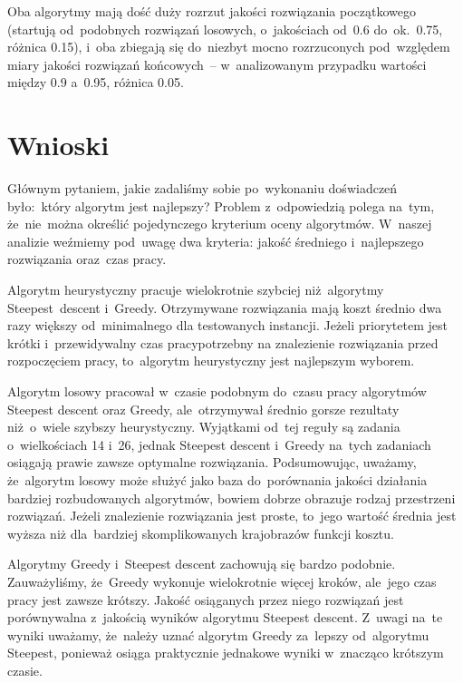 \documentclass[a4paper,10pt]{article}
\begin{document}
Oba algorytmy mają dość duży rozrzut jakości rozwiązania początkowego (startują od~podobnych rozwiązań losowych, o~jakościach
od~\num{0.6} do~ok.~\num{0.75}, różnica \num{0.15}), i~oba zbiegają się do~niezbyt mocno rozrzuconych pod~względem miary jakości rozwiązań końcowych~--
w~analizowanym przypadku wartości między \num{0.9} a~\num{0.95}, różnica \num{0.05}.

\section{Wnioski}
Głównym pytaniem, jakie zadaliśmy sobie po~wykonaniu doświadczeń było:~który algorytm jest najlepszy?
Problem z~odpowiedzią polega na~tym, że~nie~można określić pojedynczego kryterium oceny algorytmów.
W~naszej analizie weźmiemy pod~uwagę dwa kryteria: jakość średniego i~najlepszego rozwiązania oraz~czas pracy.

Algorytm heurystyczny pracuje wielokrotnie szybciej niż~algorytmy Steepest~descent i~Greedy.
Otrzymywane rozwiązania mają koszt średnio dwa razy większy od~minimalnego dla testowanych instancji.
Jeżeli priorytetem jest krótki i~przewidywalny czas pracypotrzebny na znalezienie rozwiązania przed rozpoczęciem pracy, to~algorytm heurystyczny jest najlepszym wyborem.

Algorytm losowy pracował w~czasie podobnym do~czasu pracy algorytmów Steepest descent oraz Greedy, ale~otrzymywał średnio gorsze
rezultaty niż~o~wiele szybszy heurystyczny.
Wyjątkami od~tej reguły są zadania o~wielkościach 14 i~26, jednak Steepest descent i~Greedy na~tych zadaniach osiągają prawie zawsze optymalne rozwiązania.
Podsumowując, uważamy, że~algorytm losowy może służyć jako baza do~porównania jakości działania bardziej rozbudowanych algorytmów,
bowiem dobrze obrazuje rodzaj przestrzeni rozwiązań.
Jeżeli znalezienie rozwiązania jest proste, to~jego wartość średnia jest wyższa niż dla~bardziej skomplikowanych krajobrazów funkcji
kosztu.

Algorytmy Greedy i~Steepest descent zachowują się bardzo podobnie.
Zauważyliśmy, że~Greedy wykonuje wielokrotnie więcej kroków, ale~jego czas pracy jest zawsze krótszy.
Jakość osiąganych przez niego rozwiązań jest porównywalna z~jakością wyników algorytmu Steepest descent.
Z~uwagi na~te wyniki uważamy, że~należy uznać algorytm Greedy za~lepszy od~algorytmu Steepest, ponieważ osiąga praktycznie jednakowe
wyniki w~znacząco krótszym czasie.
\end{document}
